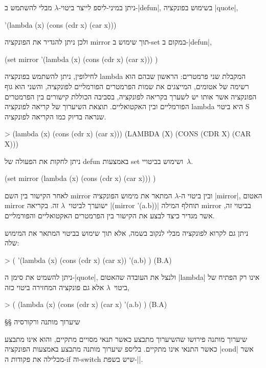 ניתן במיני-ליספ לייצר ביטוי-$λ$ מבלי להשתמש ב-\E|defun|, בשימוש בפונקציה
\E|quote|,
\begin{LISP}
  '(lambda (x) (cons (cdr x) (car x)))
\end{LISP}
ולכן ניתן להגדיר את הפונקציה mirror תוך שימוש ב-set במקום ב-\E|defun|,
\begin{LISP}
(set mirror
  '(lambda (x)
      (cons (cdr x) (car x)))
)
\end{LISP}
לחילופין, ניתן להשתמש בפונקציה lambda המקבלת שני פרמטרים: הראשון שבהם הוא רשימה
של אטומים, המייצגים את שמות הפרמטרים הפורמליים לפונקציה, והשני הוא גוף הפונקציה
אשר אותו יש לשערך בקריאה לפונקציה, בסביבה הכוללת קישורים בין הפרמטרים הפורמליים
ובין האקטואליים. תוצאת השיערוך של קריאה לפונקציה lambda היא ביטוי S שנראה
בדיוק כמו הקריאה לפונקציה.
\begin{LISP}
> (lambda (x) (cons (cdr x) (car x)))
(LAMBDA (X) (CONS (CDR X) (CAR X)))
\end{LISP}
ניתן לחקות את הפעולה של defun באמצעות set ושימוש בביטויי~$λ$.
\begin{LISP}
(set
  mirror
  (lambda (x) (cons (cdr x) (car x)))
)
\end{LISP}
לאחר הקישור בין השם mirror ובין ביטוי ה-$λ$ המתאר את מימוש הפונקציה \E|mirror|,
האטום mirror ישוערך לביטוי~$λ$ זה. בקריאה \T|(mirror '(a.b))| תוחלף המילה
mirror בביטוי זה, אשר מגדיר כיצד לבצע את הקישור בין הפרמטרים האקטואליים
והפורמליים.

ניתן גם לקרוא לפונקציה מבלי לנקוב בשמה, אלא תוך שימוש בביטוי המתאר את המימוש
שלה:
\pagebreak[3]
\begin{LISP}
> (
    '(lambda (x)
      (cons (cdr x) (car x))
    '(a.b)
)
(B.A)
\end{LISP}
ניתן להשמיט את סימן ה-\E|quote|, ולנצל את העובדה שהאטום \T|lambda| אינו רק
הפתיח של ביטוי~$λ$ אלא גם פונקציה המחזירה ביטוי כזה,
\begin{LISP}
> (
    (lambda (x) (cons (cdr x) (car x)
    '(a.b)
)
(B.A)
\end{LISP}

§§ שיערוך מותנה ורקורסיה

שיערוך מותנה פירושו שהשיערוך מתבצע כאשר תנאי מסויים מתקיים, והוא אינו מתבצע
כאשר התנאי אינו מתקיים. בליספ שיערוך מותנה מתבצע באמצעות הפונקציה \E|cond|
אשר מכלילה את פקודות ה-if וה-switch שיש בשפת-\E|\CPL|.

